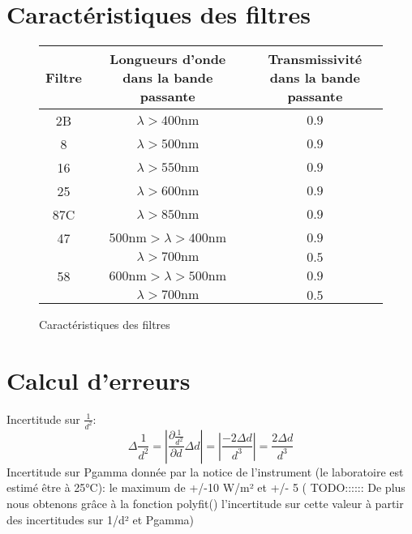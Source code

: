 \section{Caractéristiques des filtres}

\begin{figure}[h]
\centering
\begin{tabulary}{0.7\linewidth}{C C C}
    \toprule
    Filtre & Longueurs d'onde dans la bande passante & Transmissivité dans la bande passante \\
    \midrule
    2B  & $\lambda > 400 \unit{\nano \metre}$ & $0.9$ \\
    8   & $\lambda > 500 \unit{\nano \metre}$ & $0.9$ \\
    16  & $\lambda > 550 \unit{\nano \metre}$ & $0.9$ \\
    25  & $\lambda > 600 \unit{\nano \metre}$ & $0.9$ \\
    87C & $\lambda > 850 \unit{\nano \metre}$ & $0.9$ \\
    47  & $500 \unit{\nano \metre} > \lambda > 400 \unit{\nano \metre}$ & $0.9$ \\
        & $\lambda > 700 \unit{\nano \metre}$ & $0.5$ \\
    58  & $600 \unit{\nano \metre} > \lambda > 500 \unit{\nano \metre}$ & $0.9$ \\
        & $\lambda > 700 \unit{\nano \metre}$ & $0.5$ \\
    \bottomrule
    \end{tabulary}
    \caption{Caractéristiques des filtres \cite{notice}}
    \label{tab:filters}
\end{figure}

\section{Calcul d'erreurs}


Incertitude sur \(\frac{1}{d^2}\): 
\begin{equation*} 
    \Delta \frac{1}{d^2} = \left|\frac{\partial\frac{1}{d^2}}{\partial d}\Delta d\right| = \left|\frac{-2\Delta d}{d^3}\right| = \frac{2\Delta d}{d^3} 
\end{equation*}
Incertitude sur Pgamma donnée par la notice de l'instrument (le laboratoire est estimé être à 25°C): le maximum de +/-10 W/m² et +/- 5%
(   TODO::::::    De plus nous obtenons grâce à la fonction polyfit() l'incertitude sur cette valeur à partir des incertitudes sur 1/d² et Pgamma)



